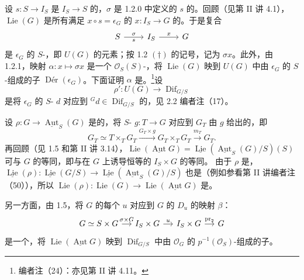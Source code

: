 设 $s:S\to I_S$ 是 $I_S\to S$ 的，$\sigma$ 是 1.2.0 中定义的 $s$ 的。回顾（见第 II 讲 4.1），$\operatorname{Lie}(G)$ 是所有满足 $x\circ s=\epsilon_G$ 的 $x:I_S\to G$ 的。于是复合
\[
\begin{tikzcd}S\arrow[r,"\sigma","s"']&I_S\arrow[r,"x"]&G\end{tikzcd}
\]
是 $\epsilon_G$ 的 $S$-，即 $U(G)$ 的元素；按 1.2 $(\dagger)$ 的记号，记为 $\sigma x$。此外，由 1.2.1，映射 $\alpha:x\mapsto\sigma x$ 是一个 $\mathcal O_S(S)$-，将 $\operatorname{Lie}(G)$ 映到 $U(G)$ 中由 $\epsilon_G$ 的 $S$-组成的子 $\operatorname{D\text{é}r}(\epsilon_G)$。下面证明 $\alpha$ 是。\footnote{编者注（24）：亦见第 II 讲 4.11。}设
\[
\rho':U(G)\longrightarrow\operatorname{Dif}_{G/S}
\]
是将 $\epsilon_G$ 的 $S$- $d$ 对应到 ${}^Gd\in\operatorname{Dif}_{G/S}$ 的，见 2.2 编者注（17）。

设 $\rho:G\to\underline{\operatorname{Aut}}_S(G)$ 是的，将 $S$- $g:T\to G$ 对应到 $G_T$ 由 $g$ 给出的，即
\[
G_T\simeq T\times_T G_T\xrightarrow{G_T\times g}G_T\times_T G_T\xrightarrow{m_T}G_T.
\]
再回顾（见 1.5 和第 II 讲 3.14），$\operatorname{Lie}(\underline{\operatorname{Aut}}G)=\underline{\operatorname{Lie}}(\underline{\operatorname{Aut}}_S(G)/S)(S)$ 可与 $G$ 的等同，即与在 $G$ 上诱导恒等的 $I_S\times G$ 的等同。
由于 $\rho$ 是， $\underline{\operatorname{Lie}}(\rho):\underline{\operatorname{Lie}}(G/S)\to\underline{\operatorname{Lie}}(\underline{\operatorname{Aut}}_S(G)/S)$ 也是（例如参看第 II 讲编者注（50）），所以 $\operatorname{Lie}(\rho):\operatorname{Lie}(G)\to\operatorname{Lie}(\underline{\operatorname{Aut}}G)$ 是。

另一方面，由 1.5，将 $G$ 的每个 $u$ 对应到 $G$ 的 $D_u$ 的映射 $\beta$：
\[
\begin{tikzcd}[column sep=small]
G\simeq S\times G\arrow[r,"\sigma\times G"]&I_S\times G\arrow[r,"u"]&I_S\times G\arrow[r,"\operatorname{pr}_2"]&G
\end{tikzcd}
\]
是一个，将 $\operatorname{Lie}(\underline{\operatorname{Aut}}G)$ 映到 $\operatorname{Dif}_{G/S}$ 中由 $\mathcal O_G$ 的 $p^{-1}(\mathcal O_S)$-组成的子。

